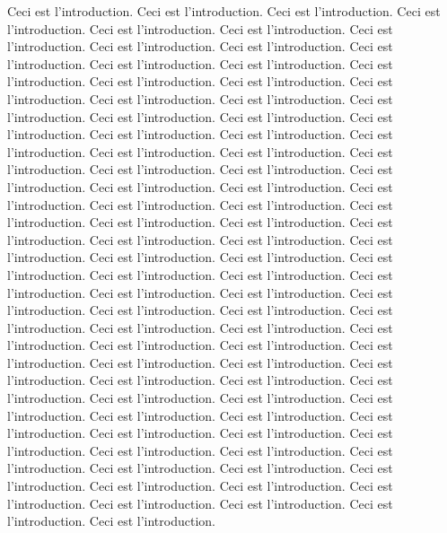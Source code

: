 \Introduction
    Ceci est l'introduction.
    Ceci est l'introduction.
    Ceci est l'introduction.
    Ceci est l'introduction.
    Ceci est l'introduction.
    Ceci est l'introduction.
    Ceci est l'introduction.
    Ceci est l'introduction.
    Ceci est l'introduction.
    Ceci est l'introduction.
    Ceci est l'introduction.
    Ceci est l'introduction.
    Ceci est l'introduction.
    Ceci est l'introduction.
    Ceci est l'introduction.
    Ceci est l'introduction.
    Ceci est l'introduction.
    Ceci est l'introduction.
    Ceci est l'introduction.
    Ceci est l'introduction.
    Ceci est l'introduction.
    Ceci est l'introduction.
    Ceci est l'introduction.
    Ceci est l'introduction.
    Ceci est l'introduction.
    Ceci est l'introduction.
    Ceci est l'introduction.
    Ceci est l'introduction.
    Ceci est l'introduction.
    Ceci est l'introduction.
    Ceci est l'introduction.
    Ceci est l'introduction.
    Ceci est l'introduction.
    Ceci est l'introduction.
    Ceci est l'introduction.
    Ceci est l'introduction.
    Ceci est l'introduction.
    Ceci est l'introduction.
    Ceci est l'introduction.
    Ceci est l'introduction.
    Ceci est l'introduction.
    Ceci est l'introduction.
    Ceci est l'introduction.
    Ceci est l'introduction.
    Ceci est l'introduction.
    Ceci est l'introduction.
    Ceci est l'introduction.
    Ceci est l'introduction.
    Ceci est l'introduction.
    Ceci est l'introduction.
    Ceci est l'introduction.
    Ceci est l'introduction.
    Ceci est l'introduction.
    Ceci est l'introduction.
    Ceci est l'introduction.
    Ceci est l'introduction.
    Ceci est l'introduction.
    Ceci est l'introduction.
    Ceci est l'introduction.
    Ceci est l'introduction.
    Ceci est l'introduction.
    Ceci est l'introduction.
    Ceci est l'introduction.
    Ceci est l'introduction.
    Ceci est l'introduction.
    Ceci est l'introduction.
    Ceci est l'introduction.
    Ceci est l'introduction.
    Ceci est l'introduction.
    Ceci est l'introduction.
    Ceci est l'introduction.
    Ceci est l'introduction.
    Ceci est l'introduction.
    Ceci est l'introduction.
    Ceci est l'introduction.
    Ceci est l'introduction.
    Ceci est l'introduction.
    Ceci est l'introduction.
    Ceci est l'introduction.
    Ceci est l'introduction.
    Ceci est l'introduction.
    Ceci est l'introduction.
    Ceci est l'introduction.
    Ceci est l'introduction.
    Ceci est l'introduction.
    Ceci est l'introduction.
    Ceci est l'introduction.
    Ceci est l'introduction.
    Ceci est l'introduction.
